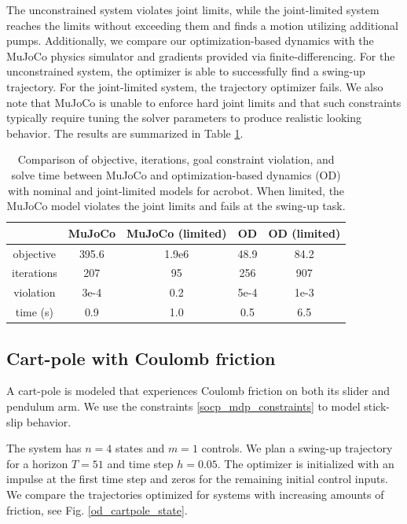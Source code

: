 The unconstrained system violates joint limits, while the joint-limited system reaches the limits without exceeding them and finds a motion utilizing additional pumps. Additionally, we compare our optimization-based dynamics with the MuJoCo physics simulator and gradients provided via finite-differencing. For the unconstrained system, the optimizer is able to successfully find a swing-up trajectory. For the joint-limited system, the trajectory optimizer fails. We also note that MuJoCo is unable to enforce hard joint limits and that such constraints typically require tuning the solver parameters to produce realistic looking behavior. The results are summarized in Table \ref{od_acrobot_results}.

\begin{table}[H]
	\centering
	\caption[Numerical results for acrobot swing-up]{Comparison of objective, iterations, goal constraint violation, and solve time between MuJoCo and optimization-based dynamics (OD) with nominal and joint-limited models for acrobot. When limited, the MuJoCo model violates the joint limits and fails at the swing-up task.}
	\begin{tabular}{c c c c c}
		\toprule
		&
		\textbf{MuJoCo} &
		\textbf{MuJoCo (limited)} &
		\textbf{OD} &
		\textbf{OD (limited)} \\
		\toprule
		objective & 395.6 & 1.9e{6} & 48.9 & 84.2 \\
		iterations & 207  & 95 & 256 & 907 \\
		violation & 3e{-}4 & 0.2 & 5e{-}4 & 1e{-}3\\
		time (s) & 0.9 & 1.0 & 0.5 & 6.5\\
		\toprule
	\end{tabular}
	\label{od_acrobot_results}
\end{table}

\subsection{Cart-pole with Coulomb friction}

A cart-pole \cite{tedrake2014underactuated} is modeled that experiences Coulomb friction \cite{moreau2011unilateral} on both its slider and pendulum arm. We use the constraints \eqref{socp_mdp_constraints} to model stick-slip behavior.

The system has $n = 4$ states and $m = 1$ controls. We plan a swing-up trajectory for a horizon $T = 51$ and time step $h = 0.05$. The optimizer is initialized with an impulse at the first time step and zeros for the remaining initial control inputs. We compare the trajectories optimized for systems with increasing amounts of friction, see Fig. \ref{od_cartpole_state}. 

